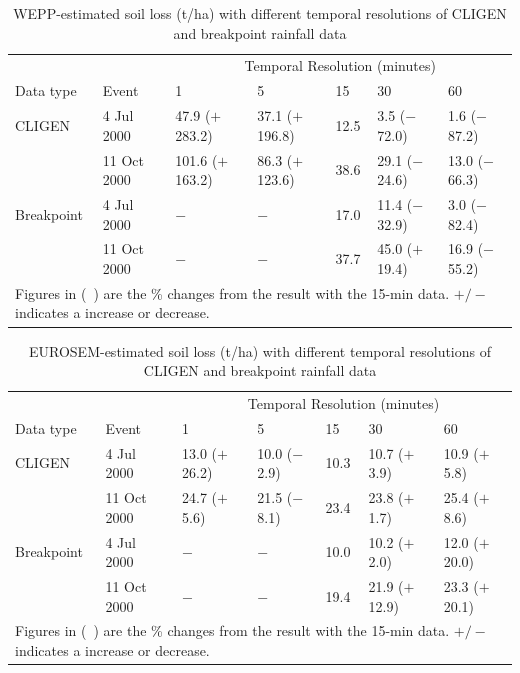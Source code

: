 \begin{table}[htbp]
  \centering
  \footnotesize
  \caption[WEPP-estimated soil loss with different temporal resolutions of
CLIGEN and breakpoint rainfall data]{WEPP-estimated soil loss (t/ha) with
different temporal resolutions of CLIGEN and breakpoint rainfall data}
  \label{tab:DifferentTemporalScalesOfRainfallDataOnWEPPSoilLossEstimation}
    \begin{tabular}{lllllll}
    \toprule
    & & \multicolumn{5}{c}{Temporal Resolution (minutes)}\\
      \cmidrule{3-7}
    Data type & Event & 1 & 5 & 15 & 30 & 60 \\
    \midrule
    CLIGEN & 4 Jul 2000 & 47.9 ($+$283.2) & 37.1 ($+$196.8) & 12.5 & 3.5
($-$72.0) & 1.6 ($-$87.2) \\
     & 11 Oct 2000 & 101.6 ($+$163.2) & 86.3 ($+$123.6) & 38.6 & 29.1 ($-$24.6)
& 13.0 ($-$66.3) \\
     \midrule
    Breakpoint & 4 Jul 2000 & $-$ & $-$ & 17.0 & 11.4 ($-$32.9) & 3.0 ($-$82.4)
\\
     & 11 Oct 2000 & $-$ & $-$ & 37.7 & 45.0 ($+$19.4) & 16.9 ($-$55.2) \\
    \bottomrule
    \multicolumn{7}{p{13cm}}{\footnotesize Figures in (\ ) are the \% changes
from the result with the 15-min data. $+/-$ indicates a increase or decrease.}\\
    \end{tabular}
\end{table}

\begin{table}[htbp]
  \centering
  \footnotesize
  \caption[EUROSEM-estimated soil loss with different temporal resolutions of
CLIGEN and breakpoint rainfall data]{EUROSEM-estimated soil loss (t/ha) with
different temporal resolutions of CLIGEN and breakpoint rainfall data}
  \label{tab:DifferentTemporalScalesOfRainfallDataOnEUROSEMSoilLoss}
    \begin{tabular}{lllllll}
    \toprule
    & & \multicolumn{5}{c}{Temporal Resolution (minutes)}\\
      \cmidrule{3-7}
    Data type & Event & 1 & 5 & 15 & 30 & 60 \\
    \midrule
    CLIGEN & 4 Jul 2000 & 13.0 ($+$26.2) & 10.0 ($-$2.9) & 10.3 & 10.7 ($+$3.9)
& 10.9 ($+$5.8) \\
     & 11 Oct 2000 & 24.7 ($+$5.6) & 21.5 ($-$8.1) & 23.4 & 23.8 ($+$1.7) & 25.4
($+$8.6) \\
     \midrule
    Breakpoint & 4 Jul 2000 & $-$ & $-$ & 10.0 & 10.2 ($+$2.0) & 12.0 ($+$20.0)
\\
     & 11 Oct 2000 & $-$ & $-$ & 19.4 & 21.9 ($+$12.9) & 23.3 ($+$20.1) \\
    \bottomrule
    \multicolumn{7}{p{12cm}}{\footnotesize Figures in (\ ) are the \% changes
from the result with the 15-min data. $+/-$ indicates a increase or decrease.}\\
    \end{tabular}
\end{table}

